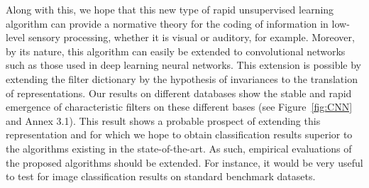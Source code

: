 \documentclass[draft]{article} %
\newcommand{\printingPaperWidth}{216mm}
\newcommand{\Acknowledgments}{%
%
This research has received funding from the European Union’s Horizon 2020 research and innovation programme under the Marie Skłodowska-Curie grant agreement No713750. Also, it has been carried out with the financial support of the Regional Council of Provence-Alpes-Côte d’Azur and with the financial support of the A*MIDEX (n° ANR- 11-IDEX-0001-02), funded by the Investissements d'Avenir project funded by the French Government, managed by the French National Research Agency (ANR).
}
\newcommand{\seeFig}[1]{Figure~\ref{fig:#1}}%
\begin{document}
Along with this, we hope that this new type of rapid unsupervised learning algorithm can provide a normative theory for the coding of information in low-level sensory processing, whether it is visual or auditory, for example. Moreover, by its nature, this algorithm can easily be extended to convolutional networks such as those used in deep learning neural networks. This extension is possible by extending the filter dictionary by the hypothesis of invariances to the translation of representations. Our results on different databases show the stable and rapid emergence of characteristic filters on these different bases (see \seeFig{CNN} and Annex 3.1). This result shows a probable prospect of extending this representation and for which we hope to obtain classification results superior to the algorithms existing in the state-of-the-art. As such, empirical evaluations of the proposed algorithms should be extended. For instance, it would be very useful to test for image classification results on standard benchmark datasets. %


\pagestyle{empty}

\end{document}
